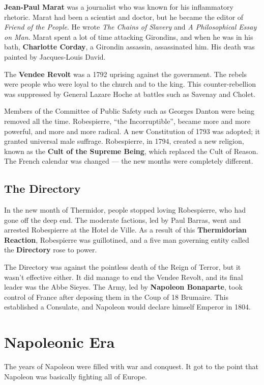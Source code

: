 \textbf{Jean-Paul Marat} was a journalist who was known for his inflammatory rhetoric.
Marat had been a scientist and doctor, but he became the editor of \textit{Friend of the People}.
He wrote \textit{The Chains of Slavery} and \textit{A Philosophical Essay on Man}.
Marat spent a lot of time attacking Girondins, and when he was in his bath,
\textbf{Charlotte Corday}, a Girondin assassin, assassinated him.
His death was painted by Jacques-Louis David.

The \textbf{Vendee Revolt} was a 1792 uprising against the government.
The rebels were people who were loyal to the church and to the king.
This counter-rebellion was suppressed by General Lazare Hoche at battles such as Savenay and Cholet.

Members of the Committee of Public Safety such as Georges Danton were being removed all the time.
Robespierre, ``the Incorruptible'', became more and more powerful, and more and more radical.
A new Constitution of 1793 was adopted; it granted universal male suffrage.
Robespierre, in 1794, created a new religion, known as the \textbf{Cult of the Supreme Being},
which replaced the Cult of Reason.
The French calendar was changed --- the new months were completely different.

\subsection*{The Directory}

In the new month of Thermidor, people stopped loving Robespierre, who had gone off the deep end.
The moderate factions, led by Paul Barras, went and arrested Robespierre at the Hotel de Ville.
As a result of this \textbf{Thermidorian Reaction}, Robespierre was guillotined,
and a five man governing entity called the \textbf{Directory} rose to power.

The Directory was against the pointless death of the Reign of Terror, but it wasn't effective either.
It did manage to end the Vendee Revolt, and its final leader was the Abbe Sieyes.
The Army, led by \textbf{Napoleon Bonaparte},
took control of France after deposing them in the Coup of 18 Brumaire.
This established a Consulate, and Napoleon would declare himself Emperor in 1804.

\section{Napoleonic Era}

The years of Napoleon were filled with war and conquest.
It got to the point that Napoleon was basically fighting all of Europe.

